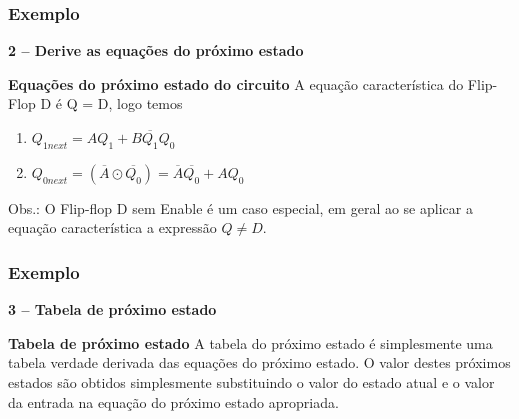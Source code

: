 \documentclass{beamer}
\begin{document}
\begin{frame}
  \frametitle{Exemplo}
  \textbf{2 – Derive as equações do próximo estado}
  \begin{block}{\textbf{Equações do próximo estado do circuito}}
    A equação característica do Flip-Flop D é Q = D, logo temos
    \begin{enumerate}
     \item $ Q_{1next} = AQ_1 + B\overline{Q_1}Q_0 $
     \item $ Q_{0next} = (\overline{A}\odot\overline{Q_0}) = \overline{A}\overline{Q_0} + AQ_0 $
    \end{enumerate}
  \end{block}\pause
  Obs.: O Flip-flop D sem Enable é um caso especial, em geral ao se aplicar a equação característica a expressão $ Q \neq D $.
\end{frame}

\begin{frame}
  \frametitle{Exemplo}
  \textbf{3 – Tabela de próximo estado}
  \begin{block}{\textbf{Tabela de próximo estado}}
    A tabela do próximo estado é simplesmente uma tabela verdade derivada das equações do próximo estado. O valor destes próximos estados são obtidos simplesmente 
    substituindo o valor do estado atual e o valor da entrada na equação do próximo estado apropriada. 
  \end{block}
\end{frame}
\end{document}
